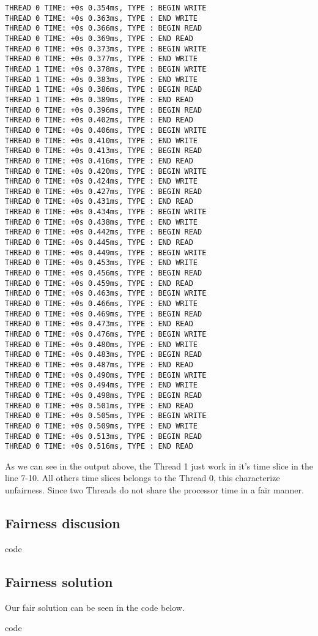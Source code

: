 \documentclass{article}
\begin{document}
\begin{lstlisting}
THREAD 0 TIME: +0s 0.354ms, TYPE : BEGIN WRITE 
THREAD 0 TIME: +0s 0.363ms, TYPE : END WRITE 
THREAD 0 TIME: +0s 0.366ms, TYPE : BEGIN READ 
THREAD 0 TIME: +0s 0.369ms, TYPE : END READ 
THREAD 0 TIME: +0s 0.373ms, TYPE : BEGIN WRITE 
THREAD 0 TIME: +0s 0.377ms, TYPE : END WRITE 
THREAD 1 TIME: +0s 0.378ms, TYPE : BEGIN WRITE 
THREAD 1 TIME: +0s 0.383ms, TYPE : END WRITE 
THREAD 1 TIME: +0s 0.386ms, TYPE : BEGIN READ 
THREAD 1 TIME: +0s 0.389ms, TYPE : END READ 
THREAD 0 TIME: +0s 0.396ms, TYPE : BEGIN READ 
THREAD 0 TIME: +0s 0.402ms, TYPE : END READ 
THREAD 0 TIME: +0s 0.406ms, TYPE : BEGIN WRITE 
THREAD 0 TIME: +0s 0.410ms, TYPE : END WRITE 
THREAD 0 TIME: +0s 0.413ms, TYPE : BEGIN READ 
THREAD 0 TIME: +0s 0.416ms, TYPE : END READ 
THREAD 0 TIME: +0s 0.420ms, TYPE : BEGIN WRITE 
THREAD 0 TIME: +0s 0.424ms, TYPE : END WRITE 
THREAD 0 TIME: +0s 0.427ms, TYPE : BEGIN READ 
THREAD 0 TIME: +0s 0.431ms, TYPE : END READ 
THREAD 0 TIME: +0s 0.434ms, TYPE : BEGIN WRITE 
THREAD 0 TIME: +0s 0.438ms, TYPE : END WRITE 
THREAD 0 TIME: +0s 0.442ms, TYPE : BEGIN READ 
THREAD 0 TIME: +0s 0.445ms, TYPE : END READ 
THREAD 0 TIME: +0s 0.449ms, TYPE : BEGIN WRITE 
THREAD 0 TIME: +0s 0.453ms, TYPE : END WRITE 
THREAD 0 TIME: +0s 0.456ms, TYPE : BEGIN READ 
THREAD 0 TIME: +0s 0.459ms, TYPE : END READ 
THREAD 0 TIME: +0s 0.463ms, TYPE : BEGIN WRITE 
THREAD 0 TIME: +0s 0.466ms, TYPE : END WRITE 
THREAD 0 TIME: +0s 0.469ms, TYPE : BEGIN READ 
THREAD 0 TIME: +0s 0.473ms, TYPE : END READ 
THREAD 0 TIME: +0s 0.476ms, TYPE : BEGIN WRITE 
THREAD 0 TIME: +0s 0.480ms, TYPE : END WRITE 
THREAD 0 TIME: +0s 0.483ms, TYPE : BEGIN READ 
THREAD 0 TIME: +0s 0.487ms, TYPE : END READ 
THREAD 0 TIME: +0s 0.490ms, TYPE : BEGIN WRITE 
THREAD 0 TIME: +0s 0.494ms, TYPE : END WRITE 
THREAD 0 TIME: +0s 0.498ms, TYPE : BEGIN READ 
THREAD 0 TIME: +0s 0.501ms, TYPE : END READ 
THREAD 0 TIME: +0s 0.505ms, TYPE : BEGIN WRITE 
THREAD 0 TIME: +0s 0.509ms, TYPE : END WRITE 
THREAD 0 TIME: +0s 0.513ms, TYPE : BEGIN READ 
THREAD 0 TIME: +0s 0.516ms, TYPE : END READ
\end{lstlisting}

As we can see in the output above, the Thread 1 just work in it's time slice in the line 7-10. All
others time slices belongs to the Thread 0, this characterize unfairness. Since two Threads do not
share the processor time in a fair manner.

\subsection{Fairness discusion}

code

\subsection{Fairness solution}

Our fair solution can be seen in the code below.

code
\end{document}
